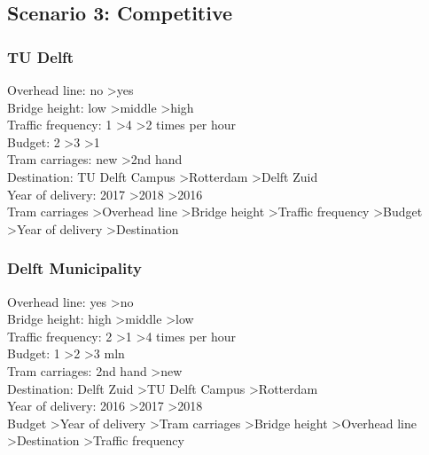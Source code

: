 \documentclass{article}
\begin{document}
\subsection{Scenario 3: Competitive}
\subsubsection{TU Delft}
Overhead line: no \textgreater yes \\
Bridge height: low \textgreater middle \textgreater high \\
Traffic frequency: 1 \textgreater 4 \textgreater 2 times per hour \\
Budget: 2 \textgreater 3 \textgreater 1 \\
Tram carriages: new \textgreater 2nd hand \\
Destination: TU Delft Campus \textgreater Rotterdam \textgreater Delft Zuid \\
Year of delivery: 2017 \textgreater 2018 \textgreater 2016 \\

Tram carriages \textgreater Overhead line \textgreater Bridge height \textgreater Traffic frequency \textgreater Budget \textgreater Year of delivery \textgreater Destination\\


\subsubsection{Delft Municipality}
Overhead line: yes \textgreater no \\
Bridge height: high \textgreater middle \textgreater low \\
Traffic frequency: 2 \textgreater 1 \textgreater 4 times per hour \\
Budget: 1 \textgreater 2 \textgreater 3 mln \\
Tram carriages: 2nd hand \textgreater new \\
Destination: Delft Zuid \textgreater TU Delft Campus \textgreater Rotterdam \\
Year of delivery: 2016 \textgreater 2017 \textgreater 2018 \\

Budget \textgreater Year of delivery \textgreater Tram carriages \textgreater Bridge height \textgreater Overhead line \textgreater Destination \textgreater Traffic frequency\\
\end{document}
